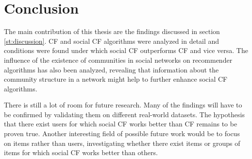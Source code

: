 \chapter{Conclusion}
\label{c:conclusion} The main contribution of this thesis are the findings discussed in section \ref{st:discussion}. CF and social CF algorithms were analyzed in detail and conditions were found under which social CF outperforms CF and vice versa. The influence of the existence of communities in social networks on recommender algorithms has also been analyzed, revealing that information about the community structure in a network might help to further enhance social CF algorithms.
\newline

There is still a lot of room for future research. Many of the findings will have to be confirmed by validating them on different real-world datasets. The hypothesis that there exist users for which social CF works better than CF remains to be proven true. Another interesting field of possible future work would be to focus on items rather than users, investigating whether there exist items or groups of items for which social CF works better than others.